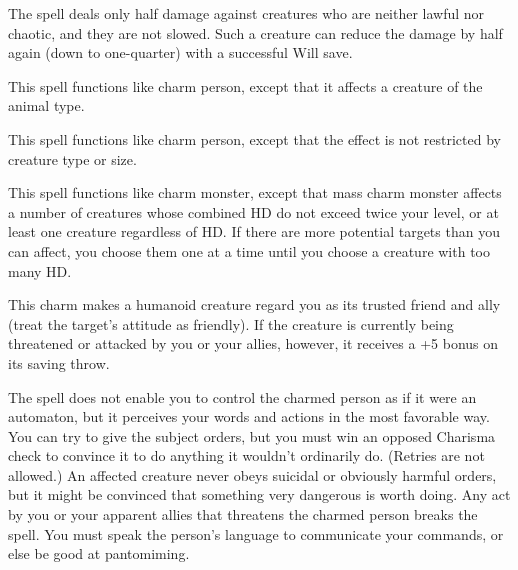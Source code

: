 \begin{multicols}{2}
\begin{small}
\smallskip\noindent The spell deals only half damage against creatures who are neither lawful nor chaotic, and they are not slowed. Such a creature can reduce the damage by half again (down to one-quarter) with a successful Will save.

\noindent This spell functions like charm person, except that it affects a creature of the animal type.

\noindent This spell functions like charm person, except that the effect is not restricted by creature type or size.

\noindent This spell functions like charm monster, except that mass charm monster affects a number of creatures whose combined HD do not exceed twice your level, or at least one creature regardless of HD. If there are more potential targets than you can affect, you choose them one at a time until you choose a creature with too many HD.

\noindent This charm makes a humanoid creature regard you as its trusted friend and ally (treat the target's attitude as friendly). If the creature is currently being threatened or attacked by you or your allies, however, it receives a +5 bonus on its saving throw. 

\smallskip\noindent The spell does not enable you to control the charmed person as if it were an automaton, but it perceives your words and actions in the most favorable way. You can try to give the subject orders, but you must win an opposed Charisma check to convince it to do anything it wouldn't ordinarily do. (Retries are not allowed.) An affected creature never obeys suicidal or obviously harmful orders, but it might be convinced that something very dangerous is worth doing.  Any act by you or your apparent allies that threatens the charmed person breaks the spell. You must speak the person's language to communicate your commands, or else be good at pantomiming.


\end{small}
\end{multicols}
